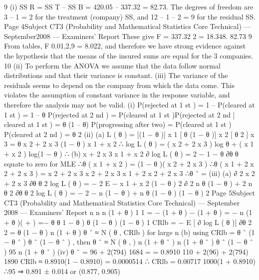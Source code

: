 9
(i)
SS R = SS T – SS B = 420.05 – 337.32 = 82.73.
The degrees of freedom are 3 – 1 = 2 for the treatment (company) SS, and
12 – 1 – 2 = 9 for the residual SS.
Page 4Subject CT3 (Probability and Mathematical Statistics Core Technical) — September2008 — Examiners’ Report
These give F =
337.32 2
= 18.348.
82.73 9
From tables, F 0.01,2,9 = 8.022, and therefore we have strong evidence against
the hypothesis that the means of the insured sums are equal for the 3
companies.
10
(ii) To perform the ANOVA we assume that the data follow normal distributions
and that their variance is constant.
(iii) The variance of the residuals seems to depend on the company from which the
data come. This violates the assumption of constant variance in the response
variable, and therefore the analysis may not be valid.
(i) P(rejected at 1 st ) = 1 – P(cleared at 1 st ) = 1 – θ
P(rejected at 2 nd ) = P(cleared at 1 st )P(rejected at 2 nd | cleared at 1 st )
= θ (1 – θ)
P(progressing after two) = P(cleared at 1 st ) P(cleared at 2 nd ) = θ 2
(ii)
(a)
L ( θ ) = [(1 − θ )] x 1 [ θ (1 − θ )] x 2 [ θ 2 ] x 3
= θ x 2 + 2 x 3 (1 − θ ) x 1 + x 2
∴ log L ( θ ) = ( x 2 + 2 x 3 ) log θ + ( x 1 + x 2 ) log(1 − θ )
∴
(b)
x + 2 x 3 x 1 + x 2
∂
log L ( θ ) = 2
−
1 − θ
∂θ
θ
equate to zero for MLE
∴θ ( x 1 + x 2 ) = (1 − θ )( x 2 + 2 x 3 )
∴θ ( x 1 + 2 x 2 + 2 x 3 ) = x 2 + 2 x 3
x 2 + 2 x 3
x 1 + 2 x 2 + 2 x 3
∴θ ˆ =
(iii)
(a)
∂ 2 x 2 + 2 x 3
∂θ θ 2
log L ( θ ) = −
2
E {
−
x 1 + x 2
(1 − θ ) 2
∂ 2 n θ (1 − θ ) + 2 n θ 2
∂θ θ 2
log L ( θ )} = −
2
−
n (1 − θ ) + n θ (1 − θ )
(1 − θ ) 2
Page 5Subject CT3 (Probability and Mathematical Statistics Core Technical) — September 2008 — Examiners’ Report
n
n
n (1 + θ )
1
1
= − (1 + θ ) −
(1 + θ ) = − n (1 + θ )( +
) =−
θ
θ 1 − θ )
θ (1 − θ )
(1 − θ )
1
CRlb =
− E [
∂
log L ( θ )]
∂θ 2
2
=
θ (1 − θ )
n (1 + θ )
θ ˆ ≈ N ( θ , CRlb ) for large n
(b)
using CRlb =
θ ˆ (1 − θ ˆ )
θ ˆ (1 − θ ˆ )
, then θ ˆ ≈ N ( θ ,
)
n (1 + θ ˆ )
n (1 + θ ˆ )
θ ˆ (1 − θ ˆ )
95%
n (1 + θ ˆ )
(iv)
θ ˆ =
96 + 2(794)
1684
=
= 0.8910
110 + 2(96) + 2(794) 1890
CRlb ≈
0.8910(1 − 0.8910)
= 0.0000514 ∴ CRlb = 0.00717
1000(1 + 0.8910)
∴95%
⇒ 0.891 ± 0.014 or (0.877, 0.905)

